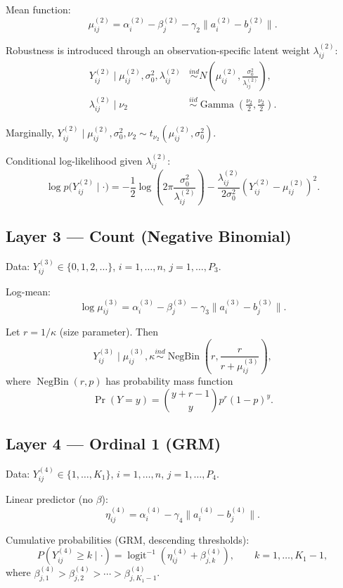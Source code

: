 \documentclass[11pt]{article}
\begin{document}
Mean function:
\[
\mu_{ij}^{(2)} = \alpha_i^{(2)} - \beta_j^{(2)} - \gamma_2\|a_i^{(2)} - b_j^{(2)}\|.
\]

Robustness is introduced through an observation-specific latent weight $\lambda_{ij}^{(2)}$:
\begin{align*}
Y_{ij}^{(2)} \mid \mu_{ij}^{(2)}, \sigma_0^2, \lambda_{ij}^{(2)}
&\overset{ind}{\sim}
N\!\left(\mu_{ij}^{(2)}, \frac{\sigma_0^2}{\lambda_{ij}^{(2)}}\right),\\
\lambda_{ij}^{(2)} \mid \nu_2
&\overset{iid}{\sim}
\operatorname{Gamma}\!\left(\frac{\nu_2}{2},\frac{\nu_2}{2}\right).
\end{align*}

Marginally, $Y_{ij}^{(2)} \mid \mu_{ij}^{(2)},\sigma_0^2,\nu_2 \sim t_{\nu_2}\!\left(\mu_{ij}^{(2)},\sigma_0^2\right)$.

Conditional log-likelihood given $\lambda_{ij}^{(2)}$:
\[
\log p\bigl(Y_{ij}^{(2)} \mid \cdot\bigr)
=
-\frac{1}{2}\log\left(2\pi \frac{\sigma_0^2}{\lambda_{ij}^{(2)}}\right)
-
\frac{\lambda_{ij}^{(2)}}{2\sigma_0^2}\left(Y_{ij}^{(2)}-\mu_{ij}^{(2)}\right)^2.
\]

\subsection{Layer 3 --- Count (Negative Binomial)}

Data: $Y_{ij}^{(3)} \in \{0,1,2,\dots\}$, $i=1,\dots,n$, $j=1,\dots,P_3$.

Log-mean:
\[
\log \mu_{ij}^{(3)} = \alpha_i^{(3)} - \beta_j^{(3)} - \gamma_3\|a_i^{(3)} - b_j^{(3)}\|.
\]

Let $r=1/\kappa$ (size parameter). Then
\[
Y_{ij}^{(3)} \mid \mu_{ij}^{(3)},\kappa
\overset{ind}{\sim}
\operatorname{NegBin}\left(r, \frac{r}{r+\mu_{ij}^{(3)}}\right),
\]
where $\operatorname{NegBin}(r,p)$ has probability mass function
\[
\Pr(Y=y)=\binom{y+r-1}{y}p^r(1-p)^y.
\]

\subsection{Layer 4 --- Ordinal 1 (GRM)}

Data: $Y_{ij}^{(4)} \in \{1,\dots,K_1\}$, $i=1,\dots,n$, $j=1,\dots,P_4$.

Linear predictor (no $\beta$):
\[
\eta_{ij}^{(4)} = \alpha_i^{(4)} - \gamma_4\|a_i^{(4)} - b_j^{(4)}\|.
\]

Cumulative probabilities (GRM, descending thresholds):
\[
P\!\left(Y_{ij}^{(4)} \geq k \mid \cdot\right)
= \operatorname{logit}^{-1}\!\left(\eta_{ij}^{(4)} + \beta_{j,k}^{(4)}\right),
\qquad k=1,\ldots,K_1-1,
\]
where $\beta_{j,1}^{(4)} > \beta_{j,2}^{(4)} > \cdots > \beta_{j,K_1-1}^{(4)}$.
\end{document}
